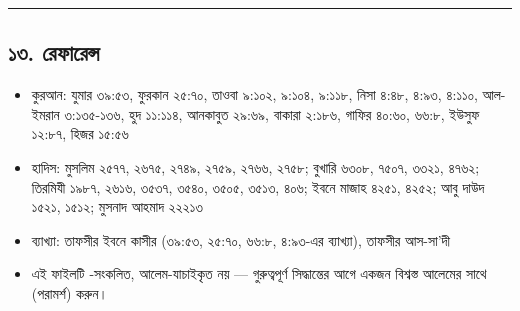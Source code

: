 \medskip\hrule\medskip

\subsection*{১৩. রেফারেন্স}

\begin{itemize}
\item কুরআন: যুমার ৩৯:৫৩, ফুরকান ২৫:৭০, তাওবা ৯:১০২, ৯:১০৪, ৯:১১৮, নিসা ৪:৪৮, ৪:৯৩, ৪:১১০, আল-ইমরান ৩:১৩৫-১৩৬, হুদ ১১:১১৪, আনকাবুত ২৯:৬৯, বাকারা ২:১৮৬, গাফির ৪০:৬০, ৬৬:৮, ইউসুফ ১২:৮৭, হিজর ১৫:৫৬
\item হাদিস: মুসলিম ২৫৭৭, ২৬৭৫, ২৭৪৯, ২৭৫৯, ২৭৬৬, ২৭৫৮; বুখারি ৬৩০৮, ৭৫০৭, ৩৩২১, ৪৭৬২; তিরমিযী ১৯৮৭, ২৬১৬, ৩৫৩৭, ৩৫৪০, ৩৫০৫, ৩৫১৩, ৪০৬; ইবনে মাজাহ ৪২৫১, ৪২৫২; আবু দাউদ ১৫২১, ১৫১২; মুসনাদ আহমাদ ২২২১৩
\item ব্যাখ্যা: তাফসীর ইবনে কাসীর (৩৯:৫৩, ২৫:৭০, ৬৬:৮, ৪:৯৩-এর ব্যাখ্যা), তাফসীর আস-সা'দী
\item এই ফাইলটি -সংকলিত, আলেম-যাচাইকৃত নয় — গুরুত্বপূর্ণ সিদ্ধান্তের আগে একজন বিশ্বস্ত আলেমের সাথে  (পরামর্শ) করুন।
\end{itemize}


